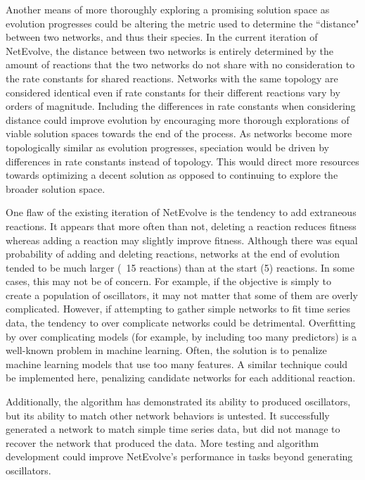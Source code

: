 \documentclass[12pt]{report}
\begin{document}
Another means of more thoroughly exploring a promising solution space as evolution progresses could be altering the metric used to determine the ``distance" between two networks, and thus their species. In the current iteration of NetEvolve, the distance between two networks is entirely determined by the amount of reactions that the two networks do not share with no consideration to the rate constants for shared reactions. Networks with the same topology are considered identical even if rate constants for their different reactions vary by orders of magnitude. Including the differences in rate constants when considering distance could improve evolution by encouraging more thorough explorations of viable solution spaces towards the end of the process. As networks become more topologically similar as evolution progresses, speciation would be driven by differences in rate constants instead of topology. This would direct more resources towards optimizing a decent solution as opposed to continuing to explore the broader solution space.

One flaw of the existing iteration of NetEvolve is the tendency to add extraneous reactions. It appears that more often than not, deleting a reaction reduces fitness whereas adding a reaction may slightly improve fitness. Although there was equal probability of adding and deleting reactions, networks at the end of evolution tended to be much larger (~15 reactions) than at the start (5) reactions. In some cases, this may not be of concern. For example, if the objective is simply to create a population of oscillators, it may not matter that some of them are overly complicated. However, if attempting to gather simple networks to fit time series data, the tendency to over complicate networks could be detrimental. Overfitting by over complicating models (for example, by including too many predictors) is a well-known problem in machine learning. Often, the solution is to penalize machine learning models that use too many features. A similar technique could be implemented here, penalizing candidate networks for each additional reaction. 

Additionally, the algorithm has demonstrated its ability to produced oscillators, but its ability to match other network behaviors is untested. It successfully generated a network to match simple time series data, but did not manage to recover the network that produced the data. More testing and algorithm development could improve NetEvolve's performance in tasks beyond generating oscillators. 
\end{document}
